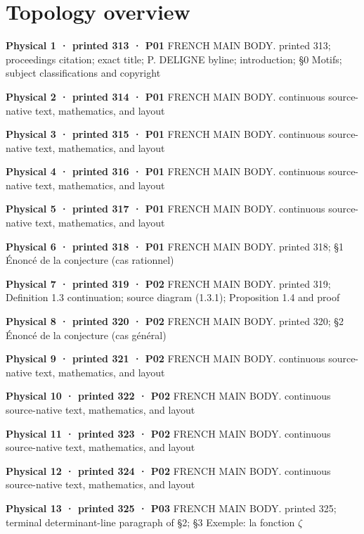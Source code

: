 \documentclass[10pt,twoside]{article}
\begin{document}
\section*{Topology overview}
\small
\noindent\textbf{Physical 1 · printed 313 · P01} \textsf{FRENCH MAIN BODY}. printed 313; proceedings citation; exact title; P. DELIGNE byline; introduction; \S{}0 Motifs; subject classifications and copyright\par\smallskip
\noindent\textbf{Physical 2 · printed 314 · P01} \textsf{FRENCH MAIN BODY}. continuous source-native text, mathematics, and layout\par\smallskip
\noindent\textbf{Physical 3 · printed 315 · P01} \textsf{FRENCH MAIN BODY}. continuous source-native text, mathematics, and layout\par\smallskip
\noindent\textbf{Physical 4 · printed 316 · P01} \textsf{FRENCH MAIN BODY}. continuous source-native text, mathematics, and layout\par\smallskip
\noindent\textbf{Physical 5 · printed 317 · P01} \textsf{FRENCH MAIN BODY}. continuous source-native text, mathematics, and layout\par\smallskip
\noindent\textbf{Physical 6 · printed 318 · P01} \textsf{FRENCH MAIN BODY}. printed 318; \S{}1 Énoncé de la conjecture (cas rationnel)\par\smallskip
\noindent\textbf{Physical 7 · printed 319 · P02} \textsf{FRENCH MAIN BODY}. printed 319; Definition 1.3 continuation; source diagram (1.3.1); Proposition 1.4 and proof\par\smallskip
\noindent\textbf{Physical 8 · printed 320 · P02} \textsf{FRENCH MAIN BODY}. printed 320; \S{}2 Énoncé de la conjecture (cas général)\par\smallskip
\noindent\textbf{Physical 9 · printed 321 · P02} \textsf{FRENCH MAIN BODY}. continuous source-native text, mathematics, and layout\par\smallskip
\noindent\textbf{Physical 10 · printed 322 · P02} \textsf{FRENCH MAIN BODY}. continuous source-native text, mathematics, and layout\par\smallskip
\noindent\textbf{Physical 11 · printed 323 · P02} \textsf{FRENCH MAIN BODY}. continuous source-native text, mathematics, and layout\par\smallskip
\noindent\textbf{Physical 12 · printed 324 · P02} \textsf{FRENCH MAIN BODY}. continuous source-native text, mathematics, and layout\par\smallskip
\noindent\textbf{Physical 13 · printed 325 · P03} \textsf{FRENCH MAIN BODY}. printed 325; terminal determinant-line paragraph of \S{}2; \S{}3 Exemple: la fonction \ensuremath{ζ}\par\smallskip
\end{document}
